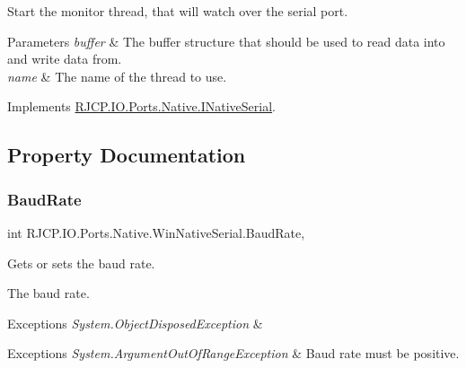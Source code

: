 Start the monitor thread, that will watch over the serial port. 


\begin{DoxyParams}{Parameters}
{\em buffer} & The buffer structure that should be used to read data into and write data from.\\
\hline
{\em name} & The name of the thread to use.\\
\hline
\end{DoxyParams}


Implements \mbox{\hyperlink{interface_r_j_c_p_1_1_i_o_1_1_ports_1_1_native_1_1_i_native_serial_a64481becda92f402e2eb7728ceb9de06}{R\+J\+C\+P.\+I\+O.\+Ports.\+Native.\+I\+Native\+Serial}}.



\subsection{Property Documentation}
\mbox{\label{class_r_j_c_p_1_1_i_o_1_1_ports_1_1_native_1_1_win_native_serial_abff2ea83a6ab8c97b685db440361967c}} 
\subsubsection{\texorpdfstring{BaudRate}{BaudRate}}
{\footnotesize\ttfamily int R\+J\+C\+P.\+I\+O.\+Ports.\+Native.\+Win\+Native\+Serial.\+Baud\+Rate\hspace{0.3cm}{\ttfamily [get]}, {\ttfamily [set]}}



Gets or sets the baud rate. 

The baud rate. 


\begin{DoxyExceptions}{Exceptions}
{\em System.\+Object\+Disposed\+Exception} & 
\begin{DoxyExceptions}{Exceptions}
{\em System.\+Argument\+Out\+Of\+Range\+Exception} & Baud rate must be positive.\\
\hline
\end{DoxyExceptions}
\\
\hline
\end{DoxyExceptions}
\mbox{\label{class_r_j_c_p_1_1_i_o_1_1_ports_1_1_native_1_1_win_native_serial_a0bfc3c17e97b361b7cf1963eea9a5daa}} 
